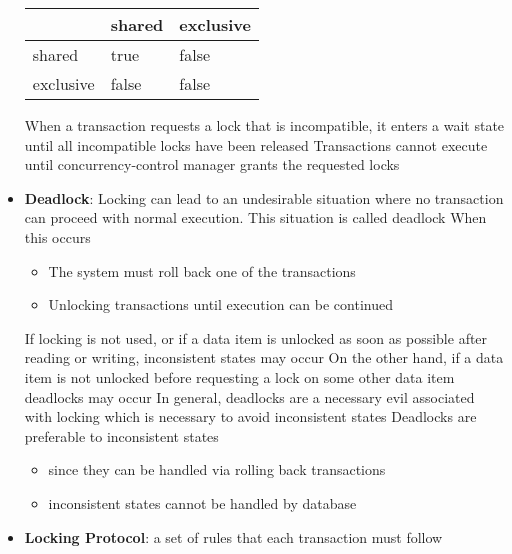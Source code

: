 \documentclass{report}
\begin{document}
\begin{itemize}
            \bigbreak \noindent 
            \begin{center}
                \begin{tabular}{p{4cm}|p{4cm}|p{4cm}}
                    & shared & exclusive \\
                    \hline
                    shared & true & false \\ 
                    exclusive & false & false
                \end{tabular}
            \end{center}
            \bigbreak \noindent 
            When a transaction requests a lock that is incompatible, it enters a wait state until all incompatible locks have been released
            \bigbreak \noindent 
            Transactions cannot execute until concurrency-control manager grants the requested locks
        \item \textbf{Deadlock}: Locking can lead to an undesirable situation where no transaction can proceed with normal execution. This situation is called deadlock
            \bigbreak \noindent 
            When this occurs
            \begin{itemize}
                \item The system must roll back one of the transactions
                \item Unlocking transactions until execution can be continued
            \end{itemize}
            \bigbreak \noindent 
            If locking is not used, or if a data item is unlocked as soon as possible after reading or writing, inconsistent states may occur
            \bigbreak \noindent 
            On the other hand, if a data item is not unlocked before requesting a lock on some other data item deadlocks may occur
            \bigbreak \noindent 
            In general, deadlocks are a necessary evil associated with locking which is necessary to avoid inconsistent states
            \bigbreak \noindent 
            Deadlocks are preferable to inconsistent states
            \begin{itemize}
                \item since they can be handled via rolling back transactions
                \item inconsistent states cannot be handled by database
            \end{itemize}
        \item \textbf{Locking Protocol}: a set of rules that each transaction must follow
            \bigbreak \noindent 

\end{itemize}
\end{document}
